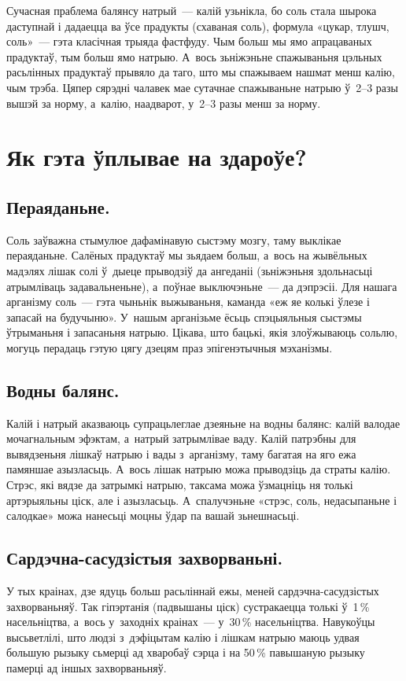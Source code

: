 Сучасная праблема балянсу натрый~--- калій узьнікла, бо соль стала шырока даступнай і дадаецца ва ўсе прадукты (схаваная соль), формула «цукар, тлушч, соль»~--- гэта класічная трыяда фастфуду. Чым больш мы ямо апрацаваных прадуктаў, тым больш ямо натрыю. А~вось зьніжэньне спажываньня цэльных расьлінных прадуктаў прывяло да таго, што мы спажываем нашмат менш калію, чым трэба. Цяпер сярэдні чалавек мае сутачнае спажываньне натрыю ў~2--3 разы вышэй за норму, а~калію, наадварот, у~2--3 разы менш за норму.

\section{Як гэта ўплывае на здароўе?}

\subsection{Пераяданьне.}
Соль заўважна стымулюе дафамінавую сыстэму мозгу, таму выклікае пераяданьне. Салёных прадуктаў мы зьядаем больш, а~вось на жывёльных мадэлях лішак солі ў~дыеце прыводзіў да ангеданіі (зьніжэньня здольнасьці атрымліваць задавальненьне), а~поўнае выключэньне~--- да дэпрэсіі. Для нашага арганізму соль~--- гэта чыньнік выжываньня, каманда «еж яе колькі ўлезе і запасай на будучыню». У~нашым арганізьме ёсьць спэцыяльныя сыстэмы ўтрыманьня і запасаньня натрыю. Цікава, што бацькі, якія злоўжываюць сольлю, могуць перадаць гэтую цягу дзецям праз эпігенэтычныя мэханізмы.

\subsection{Водны балянс.}
Калій і натрый аказваюць супрацьлеглае дзеяньне на водны балянс: калій валодае мочагнальным эфэктам, а~натрый затрымлівае ваду. Калій патрэбны для вывядзеньня лішкаў натрыю і вады з~арганізму, таму багатая на яго ежа памяншае азызласьць. А~вось лішак натрыю можа прыводзіць да страты калію. Стрэс, які вядзе да затрымкі натрыю, таксама можа ўзмацніць ня толькі артэрыяльны ціск, але і азызласьць. А~спалучэньне «стрэс, соль, недасыпаньне і салодкае» можа нанесьці моцны ўдар па вашай зьнешнасьці.

\subsection{Сардэчна-сасудзістыя захворваньні.}
У тых краінах, дзе ядуць больш расьліннай ежы, меней сардэчна-сасудзістых захворваньняў. Так гіпэртанія (падвышаны ціск) сустракаецца толькі ў~1\,\% насельніцтва, а~вось у~заходніх краінах~--- у~30\,\% насельніцтва. Навукоўцы высьветлілі, што людзі з~дэфіцытам калію і лішкам натрыю маюць удвая большую рызыку сьмерці ад хваробаў сэрца і на 50\,\% павышаную рызыку памерці ад іншых захворваньняў.

